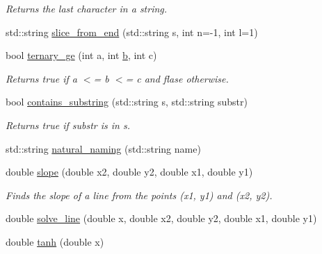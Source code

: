 \begin{DoxyCompactItemize}
\begin{DoxyCompactList}\small\item\em Returns the last character in a string. \end{DoxyCompactList}\item 
std\+::string \hyperlink{namespacepyne_abe1c85ef0d36e8e3eeb02076db773c88}{slice\+\_\+from\+\_\+end} (std\+::string s, int n=-\/1, int l=1)
\item 
\hypertarget{namespacepyne_a5bf23fa851054a44f872c65f5592db8c}{bool \hyperlink{namespacepyne_a5bf23fa851054a44f872c65f5592db8c}{ternary\+\_\+ge} (int a, int \hyperlink{namespacepyne_a12664d38214170260d6a69c4f5dda8da}{b}, int c)}\label{namespacepyne_a5bf23fa851054a44f872c65f5592db8c}

\begin{DoxyCompactList}\small\item\em Returns true if {\itshape a} $<$= {\itshape b} $<$= {\itshape c} and flase otherwise. \end{DoxyCompactList}\item 
\hypertarget{namespacepyne_aacdc15f9fd3df02a25971257b3f83b47}{bool \hyperlink{namespacepyne_aacdc15f9fd3df02a25971257b3f83b47}{contains\+\_\+substring} (std\+::string s, std\+::string substr)}\label{namespacepyne_aacdc15f9fd3df02a25971257b3f83b47}

\begin{DoxyCompactList}\small\item\em Returns true if {\itshape substr} is in {\itshape s}. \end{DoxyCompactList}\item 
std\+::string \hyperlink{namespacepyne_aa136c046c495673c1167472b96901e33}{natural\+\_\+naming} (std\+::string name)
\item 
\hypertarget{namespacepyne_a98db52b7243a761ad6f2819478eeda30}{double \hyperlink{namespacepyne_a98db52b7243a761ad6f2819478eeda30}{slope} (double x2, double y2, double x1, double y1)}\label{namespacepyne_a98db52b7243a761ad6f2819478eeda30}

\begin{DoxyCompactList}\small\item\em Finds the slope of a line from the points ({\itshape x1}, {\itshape y1}) and ({\itshape x2}, {\itshape y2}). \end{DoxyCompactList}\item 
double \hyperlink{namespacepyne_a943fe41cf25ff550684aabffe5971e1e}{solve\+\_\+line} (double x, double x2, double y2, double x1, double y1)
\item 
\hypertarget{namespacepyne_a598ae3065c54502a23495eaf06865d1d}{double \hyperlink{namespacepyne_a598ae3065c54502a23495eaf06865d1d}{tanh} (double x)}\label{namespacepyne_a598ae3065c54502a23495eaf06865d1d}


\end{DoxyCompactItemize}
